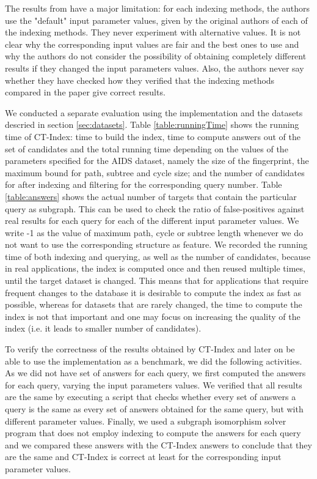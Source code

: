 \documentclass{l4proj}
\theoremstyle{definition}
\begin{document}
The results from \cite{foteini} have a major limitation: for each indexing methods, the authors use the "default" input parameter values, given by the original authors of each of the indexing methods. They never experiment with alternative values. It is not clear why the corresponding input values are fair and the best ones to use and why the authors do not consider the possibility of obtaining completely different results if they changed the input parameters values. Also, the authors never say whether they have checked how they verified that the indexing methods compared in the paper give correct results.\par
We conducted a separate evaluation using the implementation and the datasets descried in section \ref{sec:datasets}. Table \ref{table:runningTime} shows the running time of CT-Index: time to build the index, time to compute answers out of the set of candidates and the total running time depending on the values of the parameters specified for the AIDS dataset, namely the size of the fingerprint, the maximum bound for path, subtree and cycle size; and the number of candidates for after indexing and filtering for the corresponding query number. Table \ref{table:answers} shows the actual number of targets that contain the particular query as subgraph. This can be used to check the ratio of false-positives against real results for each query for each of the different input parameter values. We write -1 as the value of maximum path, cycle or subtree length whenever we do not want to use the corresponding structure as feature. We recorded the running time of both indexing and querying, as well as the number of candidates, because in real applications, the index is computed once and then reused multiple times, until the target dataset is changed. This means that for applications that require frequent changes to the database it is desirable to compute the index as fast as possible, whereas for datasets that are rarely changed, the time to compute the index is not that important and one may focus on increasing the quality of the index (i.e. it leads to smaller number of candidates).\par
To verify the correctness of the results obtained by CT-Index and later on be able to use the implementation as a benchmark, we did the following activities. As we did not have set of answers for each query, we first computed the answers for each query, varying the input parameters values. We verified that all results are the same by executing a script that checks whether every set of answers a query is the same as every set of answers obtained for the same query, but with different parameter values. Finally, we used a subgraph isomorphism solver program that does not employ indexing to compute the answers for each query and we compared these answers with the CT-Index answers to conclude that they are the same and CT-Index is correct at least for the corresponding input parameter values.\par
\end{document}
